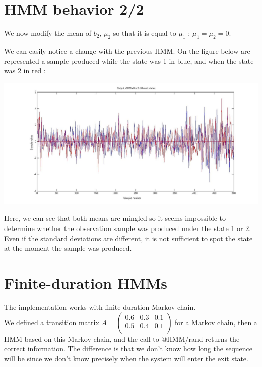 \documentclass[a4paper]{report}
\begin{document}
\section{HMM behavior 2/2}
We now modify the mean of $b_{2}$, $\mu_{2}$ so that it is equal to $\mu_{1}$ : $\mu_{1}=\mu_{2}=0$. 

We can easily notice a change with the previous HMM. On the figure below are represented a sample produced while the state was 1 in blue, and when the state was 2 in red :

\includegraphics[width=15cm]{Question_5_mean_bis.jpg}

Here, we can see that both means are mingled so it seems impossible to determine whether the observation sample was produced under the state 1 or 2. Even if the standard deviations are different, it is not sufficient to spot the state at the moment the sample was produced. 

\section{Finite-duration HMMs}
The implementation works with finite duration Markov chain.\\
We defined a transition matrix $A = \begin{pmatrix}
  0.6 & 0.3 & 0.1\\
  0.5 & 0.4 & 0.1\\
\end{pmatrix}$ for a Markov chain, then a HMM based on this Markov chain, and the call to @HMM/rand returns the correct information. The difference is that we don't know how long the sequence will be since we don't know precisely when the system will enter the exit state.
\end{document}
